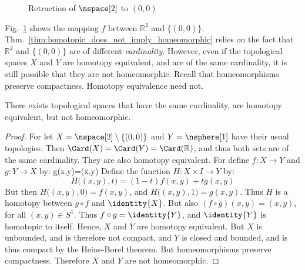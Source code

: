 \documentclass[oneside]{book}                                                  %
\begin{document}
                \begin{figure}[H]
                    \captionsetup{type=figure}
                    \centering
                    
                    \caption{Retraction of $\nspace[2]$ to $(0,0)$}
                    \label{fig:homotopy_equivalence_of_plane_with_point}
                \end{figure}
                Fig.~\ref{fig:homotopy_equivalence_of_plane_with_point}
                shows the mapping $f$ between $\mathbb{R}^{2}$ and $\{(0,0)\}$.
                Thm.~\ref{thm:homotopic_does_not_imply_homeomorphic} relies on
                the fact that $\mathbb{R}^{2}$ and $\{(0,0)\}$ are of different
                \textit{cardinality}. However, even if the topological spaces
                $X$ and $Y$ are homotopy equivalent, and are of the same
                cardinality, it is still possible that they are not
                homeomorphic. Recall that homeomorphisms preserve compactness.
                Homotopy equivalence need not.
                \begin{theorem}
                    \label{thm:HE_of_Punc_Plane_and_Circle_Not_Homeo}%
                    There exists topological spaces that have the same
                    cardinality, are homotopy equivalent, but not homeomorphic.
                \end{theorem}
                \begin{proof}
                    For let $X=\nspace[2]\setminus\{(0,0)\}$ and
                    $Y=\nsphere[1]$ have their usual topologies. Then
                    $\Card(X)=\Card(Y)=\Card(\mathbb{R})$, and thus both sets
                    are of the same cardinality. They are also homotopy
                    equivalent. For define $f:X\rightarrow{Y}$ and
                    $g:Y\rightarrow{X}$ by:
                                {g(x,y)=(x,y)}
                    Define the function $H:X\times{I}\rightarrow{Y}$ by:
                    \begin{equation}
                        H\big((x,y),t\big)=(1-t)f(x,y)+tg(x,y)
                    \end{equation}
                    But then $H\big((x,y),0\big)=f(x,y)$, and
                    $H\big((x,y),1\big)=g(x,y)$. Thus $H$ is a homotopy between
                    ${g}\circ{f}$ and $\identity{X}$. But also
                    $({f}\circ{g})(x,y)=(x,y)$, for all $(x,y)\in S^{1}$. Thus
                    ${f}\circ{g}=\identity{Y}$, and $\identity{Y}$ is homotopic
                    to itself. Hence, $X$ and $Y$ are homotopy equivalent. But
                    $X$ is unbounded, and is therefore not compact, and $Y$ is
                    closed and bounded, and is thus compact by the Heine-Borel
                    theorem. But homeomorphisms preserve compactness. Therefore
                    $X$ and $Y$ are not homeomorphic.
                \end{proof}
\end{document}

